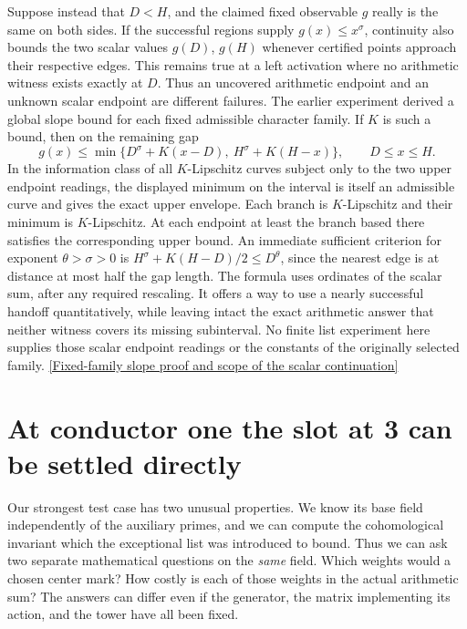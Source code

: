 \documentclass[12pt,letterpaper]{article}
\begin{document}
Suppose instead that \(D<H\), and the claimed fixed observable \(g\) really is the same on both sides. If the successful regions supply \(g(x)\le x^\sigma\), continuity also bounds the two scalar values \(g(D)\), \(g(H)\) whenever certified points approach their respective edges. This remains true at a left activation where no arithmetic witness exists exactly at \(D\). Thus an uncovered arithmetic endpoint and an unknown scalar endpoint are different failures. The earlier experiment derived a global slope bound for each fixed admissible character family. If \(K\) is such a bound, then on the remaining gap
\[
 g(x)\le \min\big\{D^\sigma+K(x-D),\ H^\sigma+K(H-x)\big\},
 \qquad D\le x\le H .
\]
In the information class of all \(K\)-Lipschitz curves subject only to the two upper endpoint readings, the displayed minimum on the interval is itself an admissible curve and gives the exact upper envelope. Each branch is \(K\)-Lipschitz and their minimum is \(K\)-Lipschitz. At each endpoint at least the branch based there satisfies the corresponding upper bound. An immediate sufficient criterion for exponent \(\theta>\sigma>0\) is \(H^\sigma+K(H-D)/2\le D^\theta\), since the nearest edge is at distance at most half the gap length. The formula uses ordinates of the scalar sum, after any required rescaling. It offers a way to use a nearly successful handoff quantitatively, while leaving intact the exact arithmetic answer that neither witness covers its missing subinterval. No finite list experiment here supplies those scalar endpoint readings or the constants of the originally selected family. \href{https://github.com/nousentllc/riemann-hypothesis/pull/18}{[Fixed-family slope proof and scope of the scalar continuation]}


\section{At conductor one the slot at 3 can be settled directly}
\label{sec:slot}
Our strongest test case has two unusual properties. We know its base field independently of the auxiliary primes, and we can compute the cohomological invariant which the exceptional list was introduced to bound. Thus we can ask two separate mathematical questions on the \emph{same} field. Which weights would a chosen center mark? How costly is each of those weights in the actual arithmetic sum? The answers can differ even if the generator, the matrix implementing its action, and the tower have all been fixed.
\end{document}

